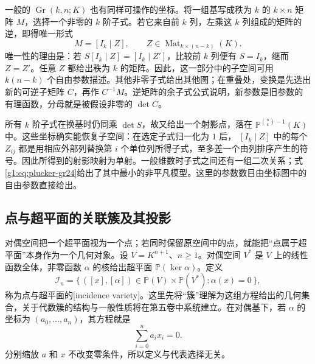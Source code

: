 一般的 \(\operatorname{Gr}(k,n;K)\) 也有同样可操作的坐标。将一组基写成秩为 \(k\) 的 \(k\times n\) 矩阵 \(M\)，选择一个非零的 \(k\) 阶子式。若它来自前 \(k\) 列，左乘这 \(k\) 列组成的矩阵的逆，即得唯一形式
\[
	M=[I_k\mid Z],\qquad Z\in\operatorname{Mat}_{k\times(n-k)}(K).
\]
唯一性的理由是：若 \(S[I_k\mid Z]=[I_k\mid Z']\)，比较前 \(k\) 列便有 \(S=I_k\)，继而 \(Z=Z'\)。任意 \(Z\) 都给出秩为 \(k\) 的矩阵。因此，这一部分中的子空间可用 \(k(n-k)\) 个自由参数描述。其他非零子式给出其他图；在重叠处，变换是先选出新的可逆子矩阵 \(C\)，再作 \(C^{-1}M\)。逆矩阵的余子式公式说明，新参数是旧参数的有理函数，分母就是被假设非零的 \(\det C\)。

\ProseParagraphBreak

所有 \(k\) 阶子式在换基时仍同乘 \(\det S\)，故又给出一个射影点，落在 \(\mathbb P^{\binom nk-1}(K)\) 中。这些坐标确实能恢复子空间：在选定子式归一化为 \(1\) 后， \([I_k\mid Z]\) 中的每个 \(Z_{ij}\) 都是用相应外部列替换第 \(i\) 个单位列所得子式，至多差一个由列排序产生的符号。因此所得到的射影映射为单射。一般维数时子式之间还有一组二次关系；式\eqref{g1:eq:plucker-gr24}给出了其中最小的非平凡模型。这里的参数数目由坐标图中的自由参数直接给出。

\subsection{点与超平面的关联簇及其投影}
\label{g1:subsec:0206:03}

对偶空间把一个超平面视为一个点；若同时保留原空间中的点，就能把“点属于超平面”本身作为一个几何对象。设 \(V=K^{n+1}\)、\(n\ge1\)。对偶空间 \(V^*\) 是 \(V\) 上的线性函数全体，非零函数 \(\alpha\) 的核给出超平面 \(\mathbb P(\ker\alpha)\)。定义
\[
	\mathcal I_n=
	\{\,([x],[\alpha])\in\mathbb P(V)\times\mathbb P(V^*):\alpha(x)=0\,\},
\]
称为点与超平面的[incidence variety]。这里先将“簇”理解为这组方程给出的几何集合，关于代数簇的结构与一般性质将在第五卷中系统建立。在对偶基下，若 \(\alpha\) 的坐标为 \((a_0,\ldots,a_n)\)，其方程就是
\[
	\sum_{i=0}^n a_i x_i=0.
\]
分别缩放 \(a\) 和 \(x\) 不改变零条件，所以定义与代表选择无关。

